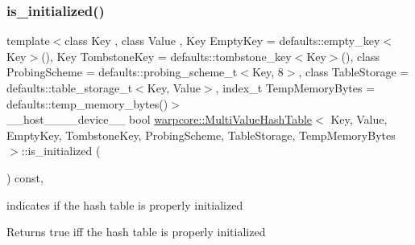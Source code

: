 \subsubsection{\texorpdfstring{is\+\_\+initialized()}{is\_initialized()}}
{\footnotesize\ttfamily template$<$class Key , class Value , Key Empty\+Key = defaults\+::empty\+\_\+key$<$\+Key$>$(), Key Tombstone\+Key = defaults\+::tombstone\+\_\+key$<$\+Key$>$(), class Probing\+Scheme  = defaults\+::probing\+\_\+scheme\+\_\+t$<$\+Key, 8$>$, class Table\+Storage  = defaults\+::table\+\_\+storage\+\_\+t$<$\+Key, Value$>$, index\+\_\+t Temp\+Memory\+Bytes = defaults\+::temp\+\_\+memory\+\_\+bytes()$>$ \\
\+\_\+\+\_\+host\+\_\+\+\_\+\+\_\+\+\_\+device\+\_\+\+\_\+ bool \hyperlink{classwarpcore_1_1MultiValueHashTable}{warpcore\+::\+Multi\+Value\+Hash\+Table}$<$ Key, Value, Empty\+Key, Tombstone\+Key, Probing\+Scheme, Table\+Storage, Temp\+Memory\+Bytes $>$\+::is\+\_\+initialized (\begin{DoxyParamCaption}{ }\end{DoxyParamCaption}) const\hspace{0.3cm}{\ttfamily [inline]}, {\ttfamily [noexcept]}}



indicates if the hash table is properly initialized 

\begin{DoxyReturn}{Returns}
{\ttfamily true} iff the hash table is properly initialized 
\end{DoxyReturn}
\mbox{\label{classwarpcore_1_1MultiValueHashTable_a76fed9a05c9111488189e1b22c435f63}} 
